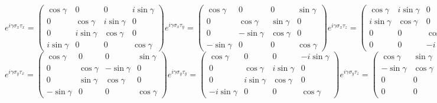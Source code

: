 \scriptsize
\begin{equation*}
e^{i\gamma\sigma_x\tau_x}=
\begin{pmatrix}
    \cos\gamma & 0 & 0 & i\sin\gamma \\
    0 & \cos\gamma & i\sin\gamma & 0 \\
    0 & i\sin\gamma & \cos\gamma & 0 \\
    i\sin\gamma & 0 & 0 & \cos\gamma
\end{pmatrix}
e^{i\gamma\sigma_x\tau_y}=
\begin{pmatrix}
    \cos\gamma & 0 & 0 & \sin\gamma \\
    0 & \cos\gamma & \sin\gamma & 0 \\
    0 & -\sin\gamma & \cos\gamma & 0 \\
    -\sin\gamma & 0 & 0 & \cos\gamma
\end{pmatrix}
e^{i\gamma\sigma_x\tau_z}=
\begin{pmatrix}
    \cos\gamma & i\sin\gamma & 0 & 0 \\
    i\sin\gamma & \cos\gamma & 0 & 0 \\
    0 & 0 & \cos\gamma & -i\sin\gamma \\
    0 & 0 & -i\sin\gamma & \cos\gamma
\end{pmatrix}
\end{equation*}
\begin{equation*}
e^{i\gamma\sigma_y\tau_x}=
\begin{pmatrix}
    \cos\gamma & 0 & 0 & \sin\gamma \\
    0 & \cos\gamma & -\sin\gamma & 0 \\
    0 & \sin\gamma & \cos\gamma & 0 \\
    -\sin\gamma & 0 & 0 & \cos\gamma
\end{pmatrix}
e^{i\gamma\sigma_y\tau_y}=
\begin{pmatrix}
    \cos\gamma & 0 & 0 & -i\sin\gamma \\
    0 & \cos\gamma & i\sin\gamma & 0 \\
    0 & i\sin\gamma & \cos\gamma & 0 \\
    -i\sin\gamma & 0 & 0 & \cos\gamma
\end{pmatrix}
e^{i\gamma\sigma_y\tau_z}=
\begin{pmatrix}
    \cos\gamma & \sin\gamma & 0 & 0 \\
    -\sin\gamma & \cos\gamma & 0 & 0 \\
    0 & 0 & \cos\gamma & -\sin\gamma \\
    0 & 0 & \sin\gamma & \cos\gamma
\end{pmatrix}
\end{equation*}
